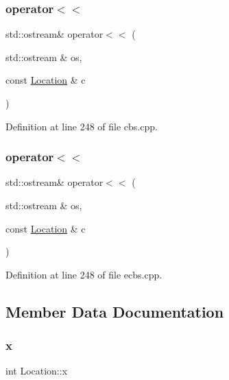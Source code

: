 \subsubsection{\texorpdfstring{operator$<$$<$}{operator<<}\hspace{0.1cm}{\footnotesize\ttfamily [1/2]}}
{\footnotesize\ttfamily std\+::ostream\& operator$<$$<$ (\begin{DoxyParamCaption}\item[{std\+::ostream \&}]{os,  }\item[{const \hyperlink{struct_location}{Location} \&}]{c }\end{DoxyParamCaption})\hspace{0.3cm}{\ttfamily [friend]}}



Definition at line 248 of file cbs.\+cpp.

\mbox{\label{struct_location_a80d23d3abaf3e34d1cb5202feb05f385}} 
\subsubsection{\texorpdfstring{operator$<$$<$}{operator<<}\hspace{0.1cm}{\footnotesize\ttfamily [2/2]}}
{\footnotesize\ttfamily std\+::ostream\& operator$<$$<$ (\begin{DoxyParamCaption}\item[{std\+::ostream \&}]{os,  }\item[{const \hyperlink{struct_location}{Location} \&}]{c }\end{DoxyParamCaption})\hspace{0.3cm}{\ttfamily [friend]}}



Definition at line 248 of file ecbs.\+cpp.



\subsection{Member Data Documentation}
\mbox{\label{struct_location_aea76eebc474e30c04c53e5f03c6749e3}} 
\subsubsection{\texorpdfstring{x}{x}}
{\footnotesize\ttfamily int Location\+::x}



